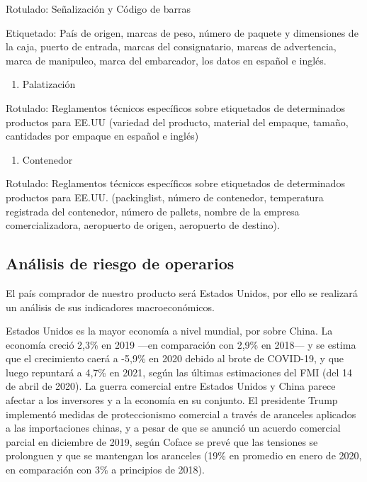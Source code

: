 \documentclass[
  stu,
  floatsintext,
  longtable,
  a4paper,
  nolmodern,
  notxfonts,
  notimes,
  colorlinks=true,linkcolor=blue,citecolor=blue,urlcolor=blue]{apa7}
\providecommand{\tightlist}{%
  \setlength{\itemsep}{0pt}\setlength{\parskip}{0pt}}
\begin{document}
Rotulado: Señalización y Código de barras

Etiquetado: País de origen, marcas de peso, número de paquete y
dimensiones de la caja, puerto de entrada, marcas del consignatario,
marcas de advertencia, marca de manipuleo, marca del embarcador, los
datos en español e inglés.

\begin{enumerate}
\def\labelenumi{\alph{enumi})}
\setcounter{enumi}{1}
\tightlist
\item
  Palatización
\end{enumerate}

Rotulado: Reglamentos técnicos específicos sobre etiquetados de
determinados productos para EE.UU (variedad del producto, material del
empaque, tamaño, cantidades por empaque en español e inglés)

\begin{enumerate}
\def\labelenumi{\alph{enumi})}
\setcounter{enumi}{2}
\tightlist
\item
  Contenedor
\end{enumerate}

Rotulado: Reglamentos técnicos específicos sobre etiquetados de
determinados productos para EE.UU. (packinglist, número de contenedor,
temperatura registrada del contenedor, número de pallets, nombre de la
empresa comercializadora, aeropuerto de origen, aeropuerto de destino).

\subsection{Análisis de riesgo de
operarios}\label{anuxe1lisis-de-riesgo-de-operarios}

El país comprador de nuestro producto será Estados Unidos, por ello se
realizará un análisis de sus indicadores macroeconómicos.

Estados Unidos es la mayor economía a nivel mundial, por sobre China. La
economía creció 2,3\% en 2019 ---en comparación con 2,9\% en 2018--- y
se estima que el crecimiento caerá a -5,9\% en 2020 debido al brote de
COVID-19, y que luego repuntará a 4,7\% en 2021, según las últimas
estimaciones del FMI (del 14 de abril de 2020). La guerra comercial
entre Estados Unidos y China parece afectar a los inversores y a la
economía en su conjunto. El presidente Trump implementó medidas de
proteccionismo comercial a través de aranceles aplicados a las
importaciones chinas, y a pesar de que se anunció un acuerdo comercial
parcial en diciembre de 2019, según Coface se prevé que las tensiones se
prolonguen y que se mantengan los aranceles (19\% en promedio en enero
de 2020, en comparación con 3\% a principios de 2018).
\end{document}
